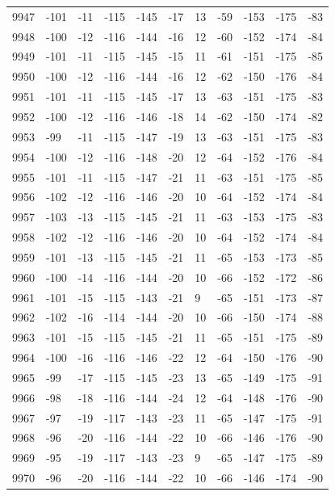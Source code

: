 \begin{table}[H]
\begin{tabular}{lllllllllll}
9947 & -101 & -11 & -115 & -145 & -17 & 13 & -59 & -153 & -175 & -83 \\
9948 & -100 & -12 & -116 & -144 & -16 & 12 & -60 & -152 & -174 & -84 \\
9949 & -101 & -11 & -115 & -145 & -15 & 11 & -61 & -151 & -175 & -85 \\
9950 & -100 & -12 & -116 & -144 & -16 & 12 & -62 & -150 & -176 & -84 \\
9951 & -101 & -11 & -115 & -145 & -17 & 13 & -63 & -151 & -175 & -83 \\
9952 & -100 & -12 & -116 & -146 & -18 & 14 & -62 & -150 & -174 & -82 \\
9953 & -99 & -11 & -115 & -147 & -19 & 13 & -63 & -151 & -175 & -83 \\
9954 & -100 & -12 & -116 & -148 & -20 & 12 & -64 & -152 & -176 & -84 \\
9955 & -101 & -11 & -115 & -147 & -21 & 11 & -63 & -151 & -175 & -85 \\
9956 & -102 & -12 & -116 & -146 & -20 & 10 & -64 & -152 & -174 & -84 \\
9957 & -103 & -13 & -115 & -145 & -21 & 11 & -63 & -153 & -175 & -83 \\
9958 & -102 & -12 & -116 & -146 & -20 & 10 & -64 & -152 & -174 & -84 \\
9959 & -101 & -13 & -115 & -145 & -21 & 11 & -65 & -153 & -173 & -85 \\
9960 & -100 & -14 & -116 & -144 & -20 & 10 & -66 & -152 & -172 & -86 \\
9961 & -101 & -15 & -115 & -143 & -21 & 9 & -65 & -151 & -173 & -87 \\
9962 & -102 & -16 & -114 & -144 & -20 & 10 & -66 & -150 & -174 & -88 \\
9963 & -101 & -15 & -115 & -145 & -21 & 11 & -65 & -151 & -175 & -89 \\
9964 & -100 & -16 & -116 & -146 & -22 & 12 & -64 & -150 & -176 & -90 \\
9965 & -99 & -17 & -115 & -145 & -23 & 13 & -65 & -149 & -175 & -91 \\
9966 & -98 & -18 & -116 & -144 & -24 & 12 & -64 & -148 & -176 & -90 \\
9967 & -97 & -19 & -117 & -143 & -23 & 11 & -65 & -147 & -175 & -91 \\
9968 & -96 & -20 & -116 & -144 & -22 & 10 & -66 & -146 & -176 & -90 \\
9969 & -95 & -19 & -117 & -143 & -23 & 9 & -65 & -147 & -175 & -89 \\
9970 & -96 & -20 & -116 & -144 & -22 & 10 & -66 & -146 & -174 & -90 \\

\end{tabular}
\end{table}
